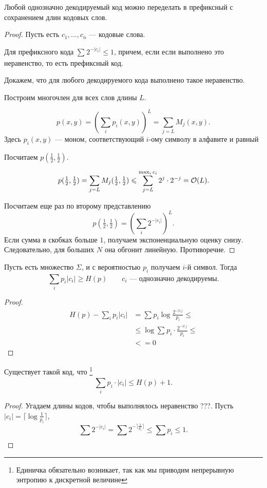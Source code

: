 \begin{thm}
    Любой однозначно декодируемый код можно переделать в префиксный с сохранением длин кодовых слов.
\end{thm}
\begin{proof}
	Пусть есть $  c_1, \ldots , c_n$ --- кодовые слова.

	Для префиксного кода $ \sum_{}^{} 2^{-\lvert c_i \rvert } \le 1$, причем, если если выполнено это неравенство, то есть префиксный код.

	Докажем, что для любого декодируемого кода выполнено такое неравенство.

	Построим многочлен для всех слов длины $ L$.

	\[
		p(x, y) = \left( \sum_{i}^{} p_i(x, y) \right) ^{L} = \sum_{j=L}^{} M_j(x, y)
	.\] 
	Здесь $ p_i(x, y)$ --- моном, соответствующий  $ i$-ому символу в алфавите и равный 

	Посчитаем $ p(\frac{1}{2}, \frac{1}{2})$.

	\[
		p(\tfrac{1}{2},\tfrac{1}{2}) = \sum_{j=L}^{} M_{j}(\tfrac{1}{2},\tfrac{1}{2}) \leqslant \sum_{j=L}^{\max_{i} c_i}2^{j} \cdot 2 ^{-j} = \mathcal{O}(L)
	.\] 

	Посчитаем еще раз по второму представлению
	\[
		p(\tfrac{1}{2},\tfrac{1}{2}) = \left( \sum_{i}^{} 2^{-\lvert c_i \rvert } \right) ^{L}
	.\] 
	Если сумма в скобках больше $ 1$, получаем экспоненциальную оценку снизу.
	Следовательно, для больших $ N$ она обгонит линейную. Противоречие.
\end{proof}


\begin{thm}[Шеннон]
Пусть есть множество $ \Sigma $, и с вероятностью $ p_i$ получаем  $ i$-й символ.
   Тогда
   \[
	   \sum_{i}^{} p_i \lvert c_i \rvert  \ge H(p) \qquad  c_i \text{ --- однозначно декодируемы}
   .\] 
\end{thm}
\begin{proof}
	\begin{align*}
		H(p) - \sum_{i}^{} p_i \lvert c_i \rvert &= \sum_{}^{} p_i \log \frac{2^{-\lvert c_i \rvert }}{p_i} \le \tag{Неравенство Йенсена}\\
												 & \le  \log \sum_{}^{} p_i \cdot \frac{2^{-\lvert c_i \rvert }}{p_i} \le \tag{Неравенство Крафта} \\
												 & <= 0
	\end{align*}
\end{proof}


\begin{thm}[Шеннон]
	Существует такой код, что \footnote{Единичка обязательно возникает, так как мы приводим непрерывную энтропию к дискретной величине}
	\[
		\sum_{i}^{} p_i \cdot \lvert c_i \rvert \le H(p) + 1
	.\] 
\end{thm}
\begin{proof}
    Угадаем длины кодов, чтобы выполнялось неравенство ???.
	Пусть $  \lvert c_i \rvert = \lceil \log \frac{1}{p_i} \rceil$,
	\[
		\sum_{}^{} 2^{- \lvert c_i \rvert } = \sum_{}^{} 2^{- \rceil \frac{1}{p_i} \rceil} \le \sum_{}^{} p_i \le 1
	.\] 
\end{proof}

